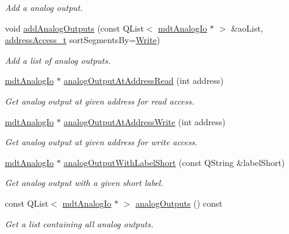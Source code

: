 \begin{DoxyCompactItemize}
\begin{DoxyCompactList}\small\item\em Add a analog output. \end{DoxyCompactList}\item 
void \hyperlink{classmdt_device_ios_acde9cd81580041c5a9bcb5e3f7ee5592}{add\-Analog\-Outputs} (const Q\-List$<$ \hyperlink{classmdt_analog_io}{mdt\-Analog\-Io} $\ast$ $>$ \&ao\-List, \hyperlink{classmdt_device_ios_a72fc3fdcd905d669b1e90496e808d6dd}{address\-Access\-\_\-t} sort\-Segments\-By=\hyperlink{classmdt_device_ios_a72fc3fdcd905d669b1e90496e808d6dda29a5b11f060f7fce671b9ced4bb4ef7a}{Write})
\begin{DoxyCompactList}\small\item\em Add a list of analog outputs. \end{DoxyCompactList}\item 
\hyperlink{classmdt_analog_io}{mdt\-Analog\-Io} $\ast$ \hyperlink{classmdt_device_ios_a74385f332753cedb68ae4133c97384be}{analog\-Output\-At\-Address\-Read} (int address)
\begin{DoxyCompactList}\small\item\em Get analog output at given address for read access. \end{DoxyCompactList}\item 
\hyperlink{classmdt_analog_io}{mdt\-Analog\-Io} $\ast$ \hyperlink{classmdt_device_ios_a968999a1021a96504805248e2ce04382}{analog\-Output\-At\-Address\-Write} (int address)
\begin{DoxyCompactList}\small\item\em Get analog output at given address for write access. \end{DoxyCompactList}\item 
\hyperlink{classmdt_analog_io}{mdt\-Analog\-Io} $\ast$ \hyperlink{classmdt_device_ios_aab2b2b1f8c887eb9f439cf495ec95fbd}{analog\-Output\-With\-Label\-Short} (const Q\-String \&label\-Short)
\begin{DoxyCompactList}\small\item\em Get analog output with a given short label. \end{DoxyCompactList}\item 
const Q\-List$<$ \hyperlink{classmdt_analog_io}{mdt\-Analog\-Io} $\ast$ $>$ \hyperlink{classmdt_device_ios_aa4ddc48f9e3258adc7222ef3481a518e}{analog\-Outputs} () const 
\begin{DoxyCompactList}\small\item\em Get a list containing all analog outputs. \end{DoxyCompactList}\item 

\end{DoxyCompactItemize}
